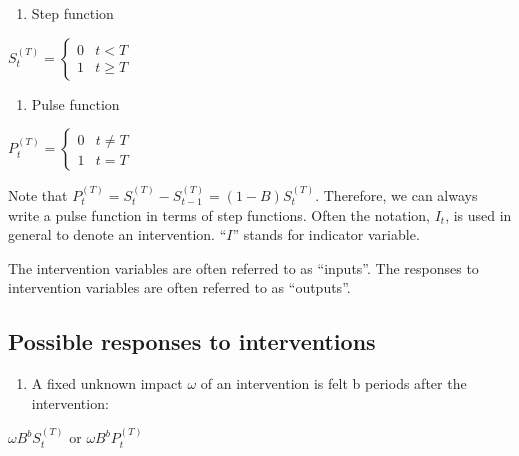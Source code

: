 \documentclass[
]{book}
\providecommand{\tightlist}{%
  \setlength{\itemsep}{0pt}\setlength{\parskip}{0pt}}
\theoremstyle{definition}
\theoremstyle{definition}
\theoremstyle{definition}
\theoremstyle{definition}
\theoremstyle{remark}
\begin{document}
\begin{enumerate}
\def\labelenumi{\arabic{enumi}.}
\tightlist
\item
  Step function
\end{enumerate}

\(S^{(T)}_t=\begin{cases}0 & t<T \\ 1 & t\ge T\end{cases}\)

\begin{enumerate}
\def\labelenumi{\arabic{enumi}.}
\setcounter{enumi}{1}
\tightlist
\item
  Pulse function
\end{enumerate}

\(P_t^{(T)}=\begin{cases}0 & t\ne T \\ 1 & t=T\end{cases}\)

Note that \(P_t^{(T)}=S^{(T)}_t-S^{(T)}_{t-1}=(1-B)S^{(T)}_t\). Therefore, we can always write a pulse function in terms of step functions. Often the notation, \(I_t\), is used in general to denote an intervention. ``\(I\)'' stands for indicator variable.

The intervention variables are often referred to as ``inputs''. The responses to intervention variables are often referred to as ``outputs''.

\hypertarget{possible-responses-to-interventions}{%
\subsection{Possible responses to interventions}\label{possible-responses-to-interventions}}

\begin{enumerate}
\def\labelenumi{\arabic{enumi}.}
\tightlist
\item
  A fixed unknown impact \(\omega\) of an intervention is felt b periods after the intervention:
\end{enumerate}

\(\omega B^bS_t^{(T)}\) or \(\omega B^bP^{(T)}_t\)
\end{document}
